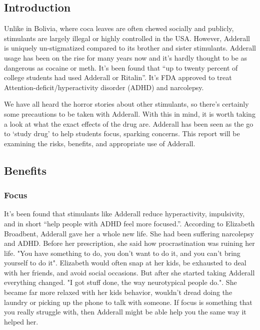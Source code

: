 \documentclass{article}
\begin{document}
        \subsection{Introduction}
            Unlike in Bolivia, where coca leaves are often chewed socially and publicly, stimulants are largely illegal or highly controlled in the USA. However, Adderall is uniquely un-stigmatized compared to its brother and sister stimulants. Adderall usage has been on the rise for many years now and it’s hardly thought to be as dangerous as cocaine or meth. It’s been found that “up to twenty percent of college students had used Adderall or Ritalin”\cite{rolland16}. It's FDA approved to treat Attention-deficit/hyperactivity disorder (ADHD) and narcolepsy. 
            
            We have all heard the horror stories about other stimulants, so there’s certainly some precautions to be taken with Adderall. With this in mind, it is worth taking a look at what the exact effects of the drug are. Adderall has been seen as the go to ‘study drug’ to help students focus, sparking concerns. This report will be examining the risks, benefits, and appropriate use of Adderall. 
        \subsection{Benefits}
            \subsubsection{Focus}
                It's been found that stimulants like Adderall reduce hyperactivity, impulsivity, and in short “help people with ADHD feel more focused.”\cite{lakhan12}. 
                According to Elizabeth Broadbent, Adderall gave her a whole new life. She had been suffering narcolepsy and ADHD. Before her prescription, she said how procrastination was ruining her life. "You have something to do, you don’t want to do it, and you can’t bring yourself to do it". Elizabeth would often snap at her kids, be exhausted to deal with her friends, and avoid social occasions. But after she started taking Adderall everything changed. "I got stuff done, the way neurotypical people do."\cite{broadbent21}. She became far more relaxed with her kids behavior, wouldn't dread doing the laundry or picking up the phone to talk with someone. 
                If focus is something that you really struggle with, then Adderall might be able help you the same way it helped her.
\end{document}
